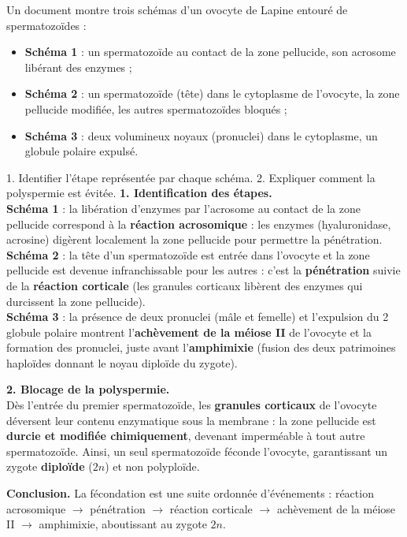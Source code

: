 \documentclass[11pt]{article}
\begin{document}
\begin{exoresolu}
Un document montre trois schémas d'un ovocyte de Lapine entouré de spermatozoïdes :
\begin{itemize}
\item \textbf{Schéma 1} : un spermatozoïde au contact de la zone pellucide, son acrosome libérant des enzymes ;
\item \textbf{Schéma 2} : un spermatozoïde (tête) dans le cytoplasme de l'ovocyte, la zone pellucide modifiée, les autres spermatozoïdes bloqués ;
\item \textbf{Schéma 3} : deux volumineux noyaux (pronuclei) dans le cytoplasme, un globule polaire expulsé.
\end{itemize}
1. Identifier l'étape représentée par chaque schéma. 2. Expliquer comment la polyspermie est évitée.
\tcblower
\textbf{1. Identification des étapes.}\\
\textbf{Schéma 1} : la libération d'enzymes par l'acrosome au contact de la zone pellucide correspond à la \textbf{réaction acrosomique} : les enzymes (hyaluronidase, acrosine) digèrent localement la zone pellucide pour permettre la pénétration.\\
\textbf{Schéma 2} : la tête d'un spermatozoïde est entrée dans l'ovocyte et la zone pellucide est devenue infranchissable pour les autres : c'est la \textbf{pénétration} suivie de la \textbf{réaction corticale} (les granules corticaux libèrent des enzymes qui durcissent la zone pellucide).\\
\textbf{Schéma 3} : la présence de deux pronuclei (mâle et femelle) et l'expulsion du 2 globule polaire montrent l'\textbf{achèvement de la méiose II} de l'ovocyte et la formation des pronuclei, juste avant l'\textbf{amphimixie} (fusion des deux patrimoines haploïdes donnant le noyau diploïde du zygote).

\textbf{2. Blocage de la polyspermie.}\\
Dès l'entrée du premier spermatozoïde, les \textbf{granules corticaux} de l'ovocyte déversent leur contenu enzymatique sous la membrane : la zone pellucide est \textbf{durcie et modifiée chimiquement}, devenant imperméable à tout autre spermatozoïde. Ainsi, un seul spermatozoïde féconde l'ovocyte, garantissant un zygote \textbf{diploïde} ($2n$) et non polyploïde.

\textbf{Conclusion.} La fécondation est une suite ordonnée d'événements : réaction acrosomique $\rightarrow$ pénétration $\rightarrow$ réaction corticale $\rightarrow$ achèvement de la méiose II $\rightarrow$ amphimixie, aboutissant au zygote $2n$.
\end{exoresolu}
\end{document}
